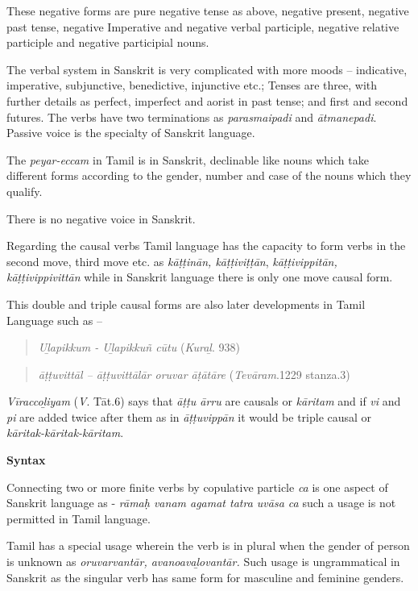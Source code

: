 These negative forms are pure negative tense as above, negative present, negative past tense, negative Imperative and negative verbal participle, negative relative participle and negative participial nouns.

The verbal system in Sanskrit is very complicated with more moods – indicative, imperative, subjunctive, benedictive, injunctive etc.; Tenses are three, with further details as perfect, imperfect and aorist in past tense; and first and second futures. The verbs have two terminations as \textit{parasmaipadi} and \textit{ātmanepadi}. Passive voice is the specialty of Sanskrit language.

The \textit{peyar-eccam} in Tamil is in Sanskrit, declinable like nouns which take different forms according to the gender, number and case of the nouns which they qualify.

There is no negative voice in Sanskrit. 

Regarding the causal verbs Tamil language has the capacity to form verbs in the second move, third move etc. as \textit{kāṭṭinān, kāṭṭiviṭṭān}, \textit{kāṭṭivippitān, kāṭṭivippivittān} while in Sanskrit language there is only one move causal form.

This double and triple causal forms are also later developments in Tamil Language such as –

\begin{verse}
\textit{Uḻapikkum - Uḻapikkuñ cūtu} (\textit{Kuraḻ}. 938)
\end{verse}

\begin{verse}
\textit{āṭṭuvittāl – āṭṭuvittālār oruvar āṭātāre} (\textit{Tevāram}.1229 stanza.3)
\end{verse}

\textit{Vīraccoḻiyam} (\textit{V}. Tāt.6) says that \textit{āṭṭu ārru} are causals or \textit{kāritam} and if \textit{vi} and\textit{ pi} are added twice after them as in \textit{āṭṭuvippān} it would be triple causal or \textit{kāritak-kāritak-kāritam}.

\textbf{Syntax}

Connecting two or more finite verbs by copulative particle \textit{ca} is one aspect of Sanskrit language as - \textit{rāmaḥ vanam agamat tatra uvāsa ca} such a usage is not permitted in Tamil language.

Tamil has a special usage wherein the verb is in plural when the gender of person is unknown as \textit{oruvarvantār, avanoavaḻovantār.} Such usage is ungrammatical in Sanskrit as the singular verb has same form for masculine and feminine genders.

